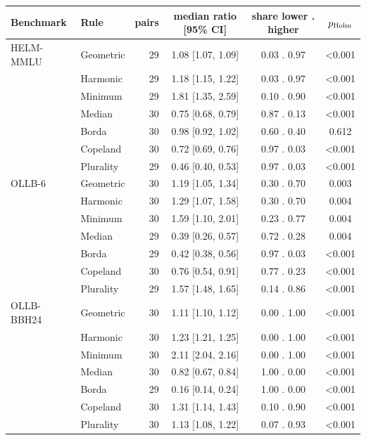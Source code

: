 \begin{tabular}{llrccc}\toprule
Benchmark & Rule & pairs & median ratio [95\% CI] & share lower . higher & $p_{\rm Holm}$\\\midrule
HELM-MMLU & Geometric & 29 & 1.08 [1.07, 1.09] & 0.03 . 0.97 & <0.001\\
 & Harmonic & 29 & 1.18 [1.15, 1.22] & 0.03 . 0.97 & <0.001\\
 & Minimum & 29 & 1.81 [1.35, 2.59] & 0.10 . 0.90 & <0.001\\
 & Median & 30 & 0.75 [0.68, 0.79] & 0.87 . 0.13 & <0.001\\
 & Borda & 30 & 0.98 [0.92, 1.02] & 0.60 . 0.40 & 0.612\\
 & Copeland & 30 & 0.72 [0.69, 0.76] & 0.97 . 0.03 & <0.001\\
 & Plurality & 29 & 0.46 [0.40, 0.53] & 0.97 . 0.03 & <0.001\\
\midrule
OLLB-6 & Geometric & 30 & 1.19 [1.05, 1.34] & 0.30 . 0.70 & 0.003\\
 & Harmonic & 30 & 1.29 [1.07, 1.58] & 0.30 . 0.70 & 0.004\\
 & Minimum & 30 & 1.59 [1.10, 2.01] & 0.23 . 0.77 & 0.004\\
 & Median & 29 & 0.39 [0.26, 0.57] & 0.72 . 0.28 & 0.004\\
 & Borda & 29 & 0.42 [0.38, 0.56] & 0.97 . 0.03 & <0.001\\
 & Copeland & 30 & 0.76 [0.54, 0.91] & 0.77 . 0.23 & <0.001\\
 & Plurality & 29 & 1.57 [1.48, 1.65] & 0.14 . 0.86 & <0.001\\
\midrule
OLLB-BBH24 & Geometric & 30 & 1.11 [1.10, 1.12] & 0.00 . 1.00 & <0.001\\
 & Harmonic & 30 & 1.23 [1.21, 1.25] & 0.00 . 1.00 & <0.001\\
 & Minimum & 30 & 2.11 [2.04, 2.16] & 0.00 . 1.00 & <0.001\\
 & Median & 30 & 0.82 [0.67, 0.84] & 1.00 . 0.00 & <0.001\\
 & Borda & 29 & 0.16 [0.14, 0.24] & 1.00 . 0.00 & <0.001\\
 & Copeland & 30 & 1.31 [1.14, 1.43] & 0.10 . 0.90 & <0.001\\
 & Plurality & 30 & 1.13 [1.08, 1.22] & 0.07 . 0.93 & <0.001\\
\bottomrule\end{tabular}
